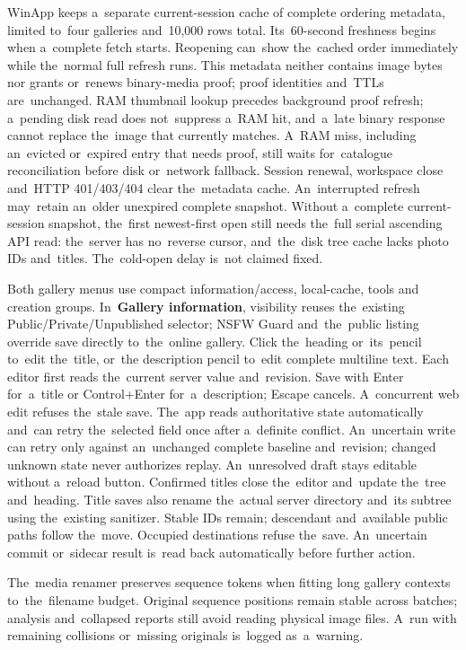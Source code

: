 \documentclass[11pt,a4paper]{article}
\newcommand{\ui}[1]{\textbf{#1}}
\begin{document}
WinApp keeps a~separate current-session cache of complete ordering metadata,
limited to~four galleries and~10,000 rows total. Its~60-second freshness begins
when a~complete fetch starts. Reopening can~show the~cached order immediately
while the~normal full refresh runs. This metadata neither contains image bytes
nor grants or~renews binary-media proof; proof identities and~TTLs are~unchanged.
RAM thumbnail lookup precedes background proof refresh; a~pending disk read
does not~suppress a~RAM hit, and~a~late binary response cannot replace the~image
that currently matches. A~RAM miss, including an~evicted or~expired entry
that needs proof, still waits for~catalogue reconciliation before disk or~network fallback. Session renewal, workspace close and~HTTP 401/403/404
clear the~metadata cache. An~interrupted refresh may~retain an~older unexpired
complete snapshot. Without a~complete current-session snapshot, the~first
newest-first open still needs the~full serial ascending API read: the~server
has no~reverse cursor, and~the~disk tree cache lacks photo IDs and~titles.
The~cold-open delay is~not claimed fixed.

Both gallery menus use compact information/access, local-cache, tools and
creation groups. In~\ui{Gallery information}, visibility reuses the~existing
Public/Private/Unpublished selector; NSFW Guard and~the~public listing override save directly
to~the~online gallery. Click the~heading or~its~pencil to~edit the~title, or~the
description pencil to~edit complete multiline text. Each editor first reads
the~current server value and~revision. Save with Enter for~a~title or
Control+Enter for~a~description; Escape cancels. A~concurrent web edit refuses
the~stale save. The~app reads authoritative state automatically and~can retry
the~selected field once after a~definite conflict. An~uncertain write can retry
only against an~unchanged complete baseline and~revision; changed unknown state
never authorizes replay. An~unresolved draft stays editable without a~reload
button. Confirmed titles close the~editor and~update the~tree
and~heading. Title saves also rename the~actual server directory and~its subtree
using the~existing sanitizer. Stable IDs remain; descendant and~available public
paths follow the~move. Occupied destinations refuse the~save. An~uncertain
commit or~sidecar result is~read back automatically before further action.

The~media renamer preserves sequence tokens when fitting long gallery contexts
to~the~filename budget. Original sequence positions remain stable across batches;
analysis and~collapsed reports still avoid reading physical image files. A~run
with remaining collisions or~missing originals is~logged as~a~warning.
\end{document}
